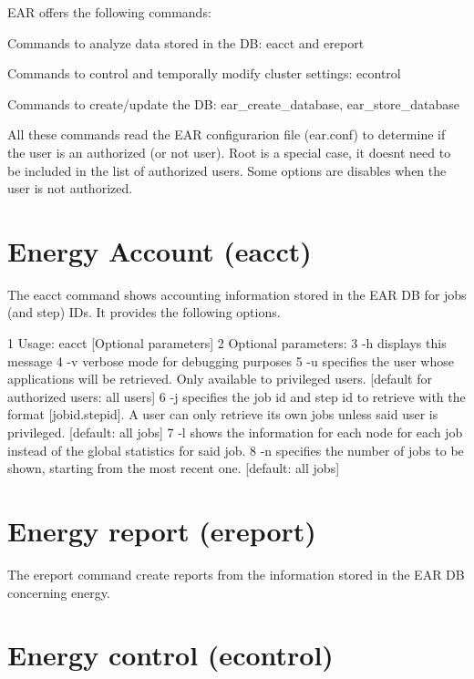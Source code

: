 E\+AR offers the following commands\+:
\begin{DoxyItemize}
\item Commands to analyze data stored in the DB\+: eacct and ereport
\item Commands to control and temporally modify cluster settings\+: econtrol
\item Commands to create/update the DB\+: ear\+\_\+create\+\_\+database, ear\+\_\+store\+\_\+database
\end{DoxyItemize}

All these commands read the E\+AR configurarion file (ear.\+conf) to determine if the user is an authorized (or not user). Root is a special case, it doesn\textquotesingle{}t need to be included in the list of authorized users. Some options are disables when the user is not authorized.

\section*{Energy Account (eacct)}

The eacct command shows accounting information stored in the E\+AR DB for jobs (and step) I\+Ds. It provides the following options. 
\begin{DoxyCode}
1 Usage: eacct [Optional parameters]
2     Optional parameters: 
3         -h  displays this message
4         -v  verbose mode for debugging purposes
5         -u  specifies the user whose applications will be retrieved. Only available to privileged users.
       [default for authorized users: all users]
6         -j  specifies the job id and step id to retrieve with the format [jobid.stepid]. A user can only
       retrieve its own jobs unless said user is privileged. [default: all jobs]
7         -l  shows the information for each node for each job instead of the global statistics for said job.
8         -n  specifies the number of jobs to be shown, starting from the most recent one. [default: all
       jobs]
\end{DoxyCode}


\section*{Energy report (ereport)}

The ereport command create reports from the information stored in the E\+AR DB concerning energy.

\section*{Energy control (econtrol)}

